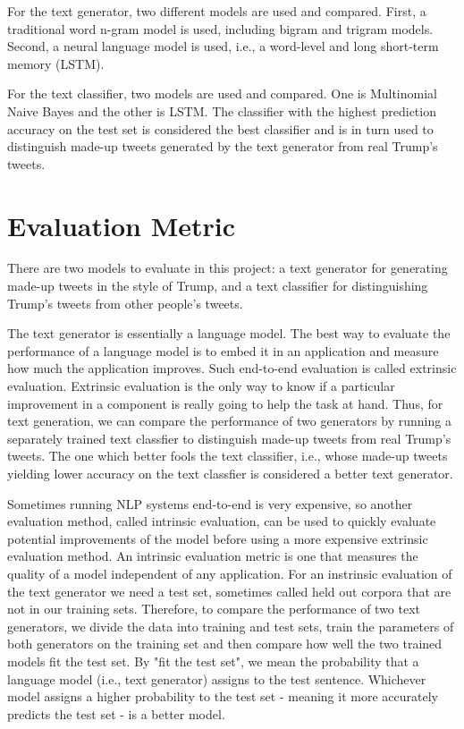 \documentclass{article}
\begin{document}
For the text generator, two different models are used and compared. First, a traditional word n-gram model is used, including bigram and trigram models. Second, a neural language model is used, i.e., a word-level and long short-term memory (LSTM).

For the text classifier, two models are used and compared. One is Multinomial Naive Bayes and the other is LSTM. The classifier with the highest prediction accuracy on the test set is considered the best classifier and is in turn used to distinguish made-up tweets generated by the text generator from real Trump's tweets.

\section{Evaluation Metric}
There are two models to evaluate in this project: a text generator for generating made-up tweets in the style of Trump, and a text classifier for distinguishing Trump's tweets from other people's tweets.

The text generator is essentially a language model. The best way to evaluate the performance of a language model is to embed it in an application and measure how much the application improves. Such end-to-end evaluation is called extrinsic evaluation. Extrinsic evaluation is the only way to know if a particular improvement in a component is really going to help the task at hand. Thus, for text generation, we can compare the performance of two generators by running a separately trained text classfier to distinguish made-up tweets from real Trump's tweets. The one which better fools the text classifier, i.e., whose made-up tweets yielding lower accuracy on the text classfier is considered a better text generator.

Sometimes running NLP systems end-to-end is very expensive, so another evaluation method, called intrinsic evaluation, can be used to quickly evaluate potential improvements of the model before using a more expensive extrinsic evaluation method. An intrinsic evaluation metric is one that measures the quality of a model independent of any application. For an instrinsic evaluation of the text generator we need a test set, sometimes called held out corpora that are not in our training sets. Therefore, to compare the performance of two text generators, we divide the data into training and test sets, train the parameters of both generators on the training set and then compare how well the two trained models fit the test set. By "fit the test set", we mean the probability that a language model (i.e., text generator) assigns to the test sentence. Whichever model assigns a higher probability to the test set - meaning it more accurately predicts the test set - is a better model. 
\end{document}
